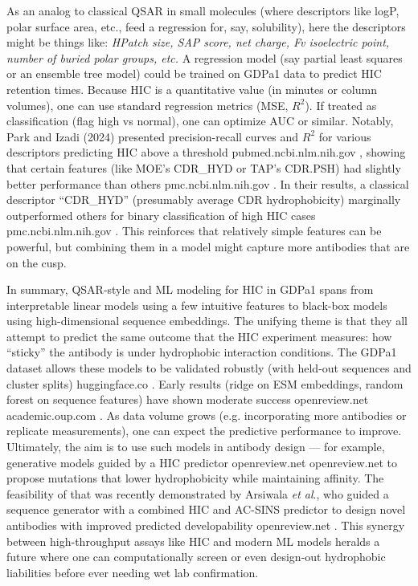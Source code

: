 \documentclass[12pt]{article}
\begin{document}
As an analog to classical QSAR in small molecules (where descriptors like logP, polar surface area, etc., feed a regression for, say, solubility), here the descriptors might be things like: \emph{HPatch size, SAP score, net charge, Fv isoelectric point, number of buried polar groups, etc.} A regression model (say partial least squares or an ensemble tree model) could be trained on GDPa1 data to predict HIC retention times. Because HIC is a quantitative value (in minutes or column volumes), one can use standard regression metrics (MSE, $R^2$). If treated as classification (flag high vs normal), one can optimize AUC or similar. Notably, Park and Izadi (2024) presented precision-recall curves and $R^2$ for various descriptors predicting HIC above a threshold
pubmed.ncbi.nlm.nih.gov
, showing that certain features (like MOE’s CDR_HYD or TAP’s CDR.PSH) had slightly better performance than others
pmc.ncbi.nlm.nih.gov
. In their results, a classical descriptor “CDR_HYD” (presumably average CDR hydrophobicity) marginally outperformed others for binary classification of high HIC cases
pmc.ncbi.nlm.nih.gov
. This reinforces that relatively simple features can be powerful, but combining them in a model might capture more antibodies that are on the cusp.

In summary, QSAR-style and ML modeling for HIC in GDPa1 spans from interpretable linear models using a few intuitive features to black-box models using high-dimensional sequence embeddings. The unifying theme is that they all attempt to predict the same outcome that the HIC experiment measures: how “sticky” the antibody is under hydrophobic interaction conditions. The GDPa1 dataset allows these models to be validated robustly (with held-out sequences and cluster splits)
huggingface.co
. Early results (ridge on ESM embeddings, random forest on sequence features) have shown moderate success
openreview.net
academic.oup.com
. As data volume grows (e.g. incorporating more antibodies or replicate measurements), one can expect the predictive performance to improve. Ultimately, the aim is to use such models in antibody design — for example, generative models guided by a HIC predictor
openreview.net
openreview.net
 to propose mutations that lower hydrophobicity while maintaining affinity. The feasibility of that was recently demonstrated by Arsiwala \textit{et al}., who guided a sequence generator with a combined HIC and AC-SINS predictor to design novel antibodies with improved predicted developability
openreview.net
. This synergy between high-throughput assays like HIC and modern ML models heralds a future where one can computationally screen or even design-out hydrophobic liabilities before ever needing wet lab confirmation.
\end{document}

